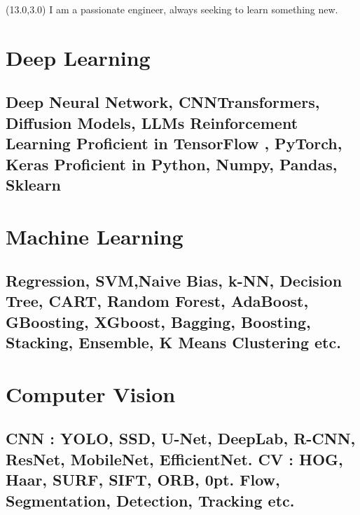 \documentclass[article]{twentysecondcv_v2} %
\begin{document}
\begin{textblock}{8}(13.0,3.0)
{I am a passionate engineer, always seeking to learn something new.}



\section{\large Deep Learning}\subsection{\small \textbf {Deep Neural Network, CNN}\newline \textbf{Transformers, Diffusion Models, LLMs} \newline \textbf{Reinforcement Learning} \newline Proficient in \textbf{TensorFlow , PyTorch, Keras}
\newline Proficient in 
\textbf{Python, Numpy, Pandas, Sklearn}}

\section{\large Machine Learning} \subsection{\small  
\textbf{Regression, SVM,Naive Bias, k-NN, Decision Tree, CART, Random Forest, AdaBoost, GBoosting, XGboost, Bagging, Boosting, Stacking, Ensemble, K Means Clustering }etc.}
\section{\large Computer Vision}\subsection{\small \textbf {CNN : YOLO, SSD, U-Net, DeepLab, R-CNN, ResNet, MobileNet, EfficientNet. CV : HOG, Haar, SURF, SIFT, ORB, 0pt. Flow, Segmentation, Detection, Tracking} etc.}

\end{textblock}
\end{document}
